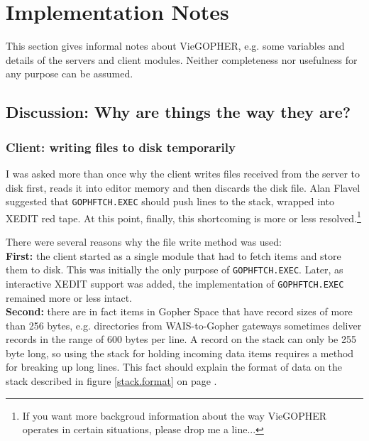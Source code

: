 \section{Implementation Notes}
 
This section gives informal notes about VieGOPHER, e.g.
some variables and details of the servers and client modules.
Neither completeness nor usefulness for any purpose can be assumed.
 
 


\subsection{Discussion: Why are things the way they are?}



\subsubsection{Client: writing files to disk temporarily}

I was asked more than once why the client writes files received from
the server to disk first, reads it into editor memory and then discards
the disk file.  Alan Flavel suggested that {\tt GOPHFTCH.EXEC}
should push lines to the stack, wrapped into {\sf XEDIT} red tape.
At this point, finally, this shortcoming is more or less
resolved.\footnote{If you want more backgroud information about the
way VieGOPHER operates in certain situations, please drop me a line...}

\noindent
There were several reasons why the file write method was used:\\
{\bf First:}  the client started as a single module that had to
fetch items and store them to disk.  This was initially the only
purpose of {\tt GOPHFTCH.EXEC}.  Later, as interactive XEDIT
support was added, the implementation of {\tt GOPHFTCH.EXEC}
remained more or less intact.\\
{\bf Second:}  there are in fact items in Gopher Space that have
record sizes of more than 256 bytes, e.g. directories from
WAIS-to-Gopher gateways sometimes deliver records in the range
of 600 bytes per line.  A record on the stack can only be
255 byte long, so using the stack for holding incoming data
items requires a method for breaking up long lines.  This fact
should explain the format of data on the stack described in
figure \ref{stack.format} on page \pageref{stack.format}.

